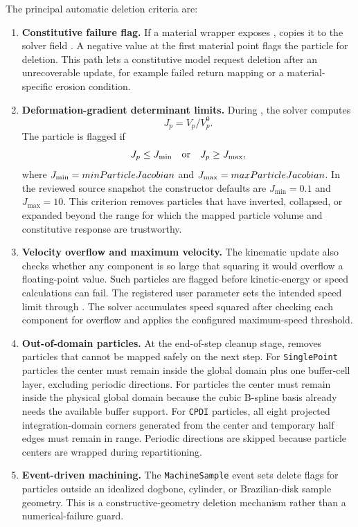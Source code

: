 The principal automatic deletion criteria are:
\begin{enumerate}
  \item \textbf{Constitutive failure flag.}  If a material wrapper exposes ,  copies it to the solver field .  A negative value at the first material point flags the particle for deletion.  This path lets a constitutive model request deletion after an unrecoverable update, for example failed return mapping or a material-specific erosion condition.
  \item \textbf{Deformation-gradient determinant limits.}  During , the solver computes
  \begin{equation}
    J_p = V_p/V_p^0.
  \end{equation}
  The particle is flagged if
  \begin{equation}
    J_p \le J_{\min}\quad\hbox{or}\quad J_p \ge J_{\max},
    \label{eq:robust-j-deletion}
  \end{equation}
  where $J_{\min}=minParticleJacobian$ and $J_{\max}=maxParticleJacobian$.  In the reviewed source snapshot the constructor defaults are $J_{\min}=0.1$ and $J_{\max}=10$.  This criterion removes particles that have inverted, collapsed, or expanded beyond the range for which the mapped particle volume and constitutive response are trustworthy.
  \item \textbf{Velocity overflow and maximum velocity.}  The kinematic update also checks whether any component is so large that squaring it would overflow a floating-point value.  Such particles are flagged before kinetic-energy or speed calculations can fail.  The registered user parameter  sets the intended speed limit through .  The solver accumulates speed squared after checking each component for overflow and applies the configured maximum-speed threshold.
  \item \textbf{Out-of-domain particles.}  At the end-of-step cleanup stage,  removes particles that cannot be mapped safely on the next step.  For \texttt{SinglePoint} particles the center must remain inside the global domain plus one buffer-cell layer, excluding periodic directions.  For  particles the center must remain inside the physical global domain because the cubic B-spline basis already needs the available buffer support.  For \texttt{CPDI} particles, all eight projected integration-domain corners generated from the center and temporary half edges must remain in range.  Periodic directions are skipped because particle centers are wrapped during repartitioning.
  \item \textbf{Event-driven machining.}  The \texttt{MachineSample} event sets delete flags for particles outside an idealized dogbone, cylinder, or Brazilian-disk sample geometry.  This is a constructive-geometry deletion mechanism rather than a numerical-failure guard.
\end{enumerate}

